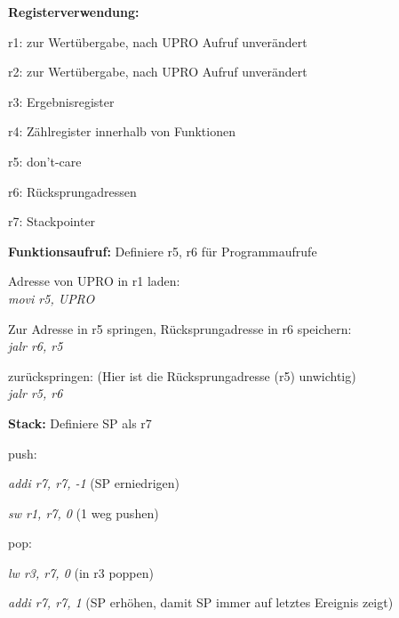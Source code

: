 \documentclass[fleqn, a4paper, 11pt]{article}       %
\begin{document}
 \textbf{Registerverwendung:}
 \begin{compactitem}
     \item r1: zur Wertübergabe, nach UPRO Aufruf unverändert
     \item r2: zur Wertübergabe, nach UPRO Aufruf unverändert
     \item r3: Ergebnisregister
     \item r4: Zählregister innerhalb von Funktionen
     \item r5: don't-care
     \item r6: Rücksprungadressen
     \item r7: Stackpointer
 \end{compactitem}
 \vspace{0.25cm}
 \noindent \textbf{Funktionsaufruf:}
     Definiere r5, r6 für Programmaufrufe
     \begin{compactenum}
     \item Adresse von UPRO in r1 laden:\\
         \emph{movi r5, UPRO} 
     \item Zur Adresse in r5 springen, Rücksprungadresse in r6 speichern:\\
         \emph{jalr r6, r5}
     \item zurückspringen: (Hier ist die Rücksprungadresse (r5) unwichtig)\\
         \emph{jalr r5, r6 }
     \end{compactenum}
     
\vspace{0.25cm}
      
 \noindent \textbf{Stack:}
     Definiere SP als r7
     \begin{compactitem}
         \item push:
         \begin {compactitem}
                  \item \emph{addi r7, r7, -1}           (SP erniedrigen)
                   \item \emph{sw  r1, r7, 0 }            (1 weg pushen)
           \end{compactitem}         
         \item pop:
             \begin{compactitem}
                   \item \emph{lw r3, r7, 0 }             (in r3 poppen) 
                   \item \emph{addi r7, r7, 1  }          (SP erhöhen, damit SP immer auf letztes Ereignis zeigt)
             \end{compactitem}                                 
         \end{compactitem}  
 
\end{document}
